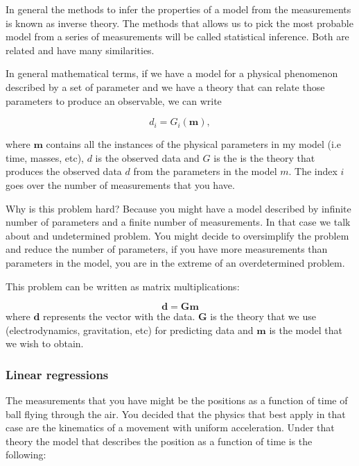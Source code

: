 \documentclass{article}
\begin{document}
In general the methods to infer the properties of a model from the measurements is known as inverse theory. The methods that allows us to pick the most probable model from a series of measurements will be called statistical inference. Both are related and have many similarities.

In general mathematical terms, if we have a model for a physical phenomenon described by a set of parameter and we have a theory that can relate those parameters to produce an observable, we can write

\begin{equation}
d_{i} = G_i (\mathbf{m}),
\end{equation}

where ${\mathbf m}$ contains all the instances of the physical parameters in my model (i.e time, masses, etc), $d$ is the observed data and $G$ is the is the theory that produces the observed data $d$ from the parameters in the model $m$. The index $i$ goes over the number of measurements that you have.

Why is this problem hard? Because you might have a model described by infinite number of parameters and a finite number of measurements. In that case we talk about and undetermined problem. You might decide to oversimplify the problem and reduce the number of parameters, if you have more measurements than parameters in the model, you are in the extreme of an overdetermined problem.

This problem can be written as matrix multiplications:


\begin{equation}
\mathbf{d} = \mathbf{G}\mathbf{m}
\end{equation}
where $\mathbf{d}$ represents the vector with the data. $\mathbf{G}$ is the theory that we use (electrodynamics, gravitation, etc) for predicting data and $\mathbf{m}$ is the model that we wish to obtain.


\subsubsection{Linear regressions}

The measurements that you have might be the positions as a function of time of ball flying through the air. You decided that the physics that best apply in that case are the kinematics of a movement with uniform acceleration. Under that theory the model that describes the position as a function of time is the following:
\end{document}
